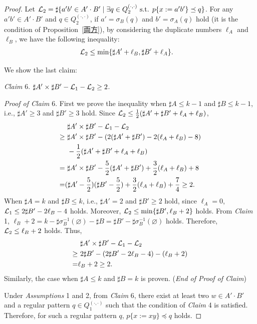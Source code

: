 \begin{proof}
\noindent
Let ${\cal L}_{2} = \sharp\{a'b' \in A'\cdot B' \mid \exists q \in Q_{2}^{(\cdot,\cdot)} \mbox{ s.t. } p\{x:=a'b'\} \preceq q\}$.
For any $a'b' \in A'\cdot B'$ and $q \in Q_{2}^{(\cdot,\cdot)}$, if $a' = \sigma_{B}(q)$ and $b' = \sigma_{A}(q)$ hold (it is the condition of Proposition~\ref{両方}), by considering the duplicate numbers $\ell_{A}$ and $\ell_{B}$, we have the following inequality:
\begin{align*}
  {\cal L}_{2} &\leq \min\{\sharp A' + \ell_{B}, \sharp B' + \ell_{A}\}.
\end{align*}

We show the last claim:
  
\smallskip

\noindent
\textit{Claim} 6. 
$\sharp A' \times \sharp B' - {\cal L}_{1} - {\cal L}_{2} \geq 2$.

\smallskip

\noindent
\textit{Proof of Claim} 6. 
First we prove the inequality when $\sharp A \leq k - 1$ and $\sharp B \leq k - 1$, i.e., $\sharp A' \geq 3$ and $\sharp B' \geq 3$ hold.
Since ${\cal L}_{2} \leq \frac{1}{2}(\sharp A' + \sharp B' + \ell_{A} + \ell_{B})$,
\begin{align*}
  &\ \sharp A' \times \sharp B' - {\cal L}_{1} - {\cal L}_{2}\\
\geq &\ \sharp A' \times \sharp B' - (2(\sharp A' + \sharp B') - 2(\ell_{A} + \ell_{B}) - 8)\\
  &\ - \frac{1}{2}(\sharp A' + \sharp B' + \ell_{A} + \ell_{B})\\
=    &\ \sharp A' \times \sharp B' - \frac{5}{2}(\sharp A' + \sharp B') + \frac{3}{2}(\ell_{A} + \ell_{B}) + 8\\
=    &(\sharp A' - \frac{5}{2})(\sharp B' - \frac{5}{2}) + \frac{3}{2}(\ell_{A} + \ell_{B}) + \frac{7}{4} \geq 2.
\end{align*}
When $\sharp A = k$ and $\sharp B \leq k$, i.e., $\sharp A' = 2$ and $\sharp B' \geq 2$ hold, since $\ell_{A} = 0$,
${\cal L}_{1} \leq 2\sharp B' - 2\ell_{B} -4$ holds.
Moreover, ${\cal L}_{2} \leq \min\{\sharp B', \ell_{B} + 2\}$ holds.
From \textit{Claim} 1, $\ell_B + 2 = k - \sharp\sigma^{-1}_{B}(\varnothing) - \sharp B = \sharp B' - \sharp\sigma^{-1}_{B}(\varnothing)$ holds. Therefore, ${\cal L}_{2} \leq \ell_{B} + 2$ holds.
Thus,
\begin{align*}
  &\ \sharp A' \times \sharp B' - {\cal L}_{1} - {\cal L}_{2}\\
\geq &\ 2\sharp B' - (2\sharp B' - 2\ell_{B} -4) - (\ell_{B} + 2)\\
= & \ell_B + 2 \geq 2.
\end{align*}
Similarly, the case when $\sharp A \leq k$ and $\sharp B = k$ is proven.
(\textit{End of Proof of Claim})

\smallskip

Under \textit{Assumptions} 1 and 2, from \textit{Claim} 6, there exist at least two $w\in A'\cdot B'$ and a regular pattern $q \in Q_{1}^{(\cdot,\cdot)}$ such that the condition of \textit{Claim} 4 is satisfied. 
Therefore, for such a regular pattern $q$, $p \{x := xy\} \preceq q$ holds.
\end{proof}

